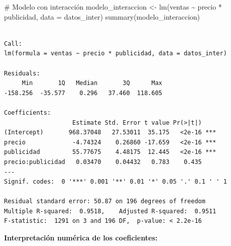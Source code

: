 \documentclass[
  letterpaper,
  DIV=11,
  numbers=noendperiod]{scrreprt}
\newenvironment{Shaded}{\begin{snugshade}}{\end{snugshade}}
\newcommand{\AttributeTok}[1]{\textcolor[rgb]{0.40,0.45,0.13}{#1}}
\newcommand{\CommentTok}[1]{\textcolor[rgb]{0.37,0.37,0.37}{#1}}
\newcommand{\DecValTok}[1]{\textcolor[rgb]{0.68,0.00,0.00}{#1}}
\newcommand{\FunctionTok}[1]{\textcolor[rgb]{0.28,0.35,0.67}{#1}}
\newcommand{\NormalTok}[1]{\textcolor[rgb]{0.00,0.23,0.31}{#1}}
\newcommand{\OtherTok}[1]{\textcolor[rgb]{0.00,0.23,0.31}{#1}}
\newcommand{\SpecialCharTok}[1]{\textcolor[rgb]{0.37,0.37,0.37}{#1}}
\newcommand{\StringTok}[1]{\textcolor[rgb]{0.13,0.47,0.30}{#1}}
\begin{document}
\begin{tcolorbox}
\begin{Shaded}
\begin{Highlighting}[]
\CommentTok{\# Modelo con interacción}
\NormalTok{modelo\_interaccion }\OtherTok{\textless{}{-}} \FunctionTok{lm}\NormalTok{(ventas }\SpecialCharTok{\textasciitilde{}}\NormalTok{ precio }\SpecialCharTok{*}\NormalTok{ publicidad, }\AttributeTok{data =}\NormalTok{ datos\_inter)}
\FunctionTok{summary}\NormalTok{(modelo\_interaccion)}
\end{Highlighting}
\end{Shaded}

\begin{verbatim}

Call:
lm(formula = ventas ~ precio * publicidad, data = datos_inter)

Residuals:
     Min       1Q   Median       3Q      Max 
-158.256  -35.577    0.296   37.460  118.605 

Coefficients:
                   Estimate Std. Error t value Pr(>|t|)    
(Intercept)       968.37048   27.53011  35.175   <2e-16 ***
precio             -4.74324    0.26860 -17.659   <2e-16 ***
publicidad         55.77675    4.48175  12.445   <2e-16 ***
precio:publicidad   0.03470    0.04432   0.783    0.435    
---
Signif. codes:  0 '***' 0.001 '**' 0.01 '*' 0.05 '.' 0.1 ' ' 1

Residual standard error: 50.87 on 196 degrees of freedom
Multiple R-squared:  0.9518,    Adjusted R-squared:  0.9511 
F-statistic:  1291 on 3 and 196 DF,  p-value: < 2.2e-16
\end{verbatim}

\textbf{Interpretación numérica de los coeficientes:}

\begin{Shaded}
\end{Shaded}
\end{tcolorbox}
\end{document}
